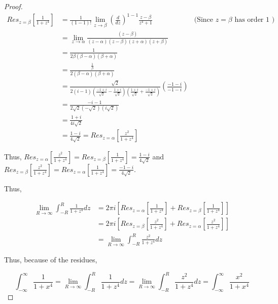 \documentclass{article}
\begin{document}
\begin{proof}
    \begin{align*}
        Res_{z = \beta}\left[\frac{1}{1 + z^4}\right] &= \frac{1}{(1 - 1)!} \lim_{z \to \beta} \left(\frac{d}{dz}\right)^{1 - 1}  \frac{z - \beta}{z^4 + 1} & \text{(Since $z = \beta$ has order 1 )} \\
        &= \lim_{z \to \alpha} \frac{(z - \beta)}{(z - \alpha)(z - \beta)(z + \alpha)(z + \beta)} \\
        &= \frac{1}{2 \beta (\beta - \alpha)(\beta + \alpha)} \\
        &= \frac{\frac{1}{\beta}}{2(\beta - \alpha)(\beta + \alpha)} \\
        &= \frac{\sqrt{2}}{2(i - 1)\left(\frac{-1 + i}{\sqrt{2}} - \frac{1 + i}{\sqrt{2}}\right)\left(\frac{1 + i}{\sqrt{2}} + \frac{-1 + i}{\sqrt{2}}\right)} \left(\frac{-1 - i}{-1 - i}\right) \\
        &= \frac{-i - 1}{2\sqrt{2}\left(-\sqrt{2}\right)\left(i\sqrt{2}\right)} \\
        &= \frac{1 + i}{4i\sqrt{2}} \\
        &= \frac{1 - i}{4\sqrt{2}} = Res_{z = \alpha}\left[\frac{z^2}{1 + z^4}\right]
    \end{align*}

    Thus, $Res_{z = \alpha}\left[\frac{z^2}{1 + z^4}\right] = Res_{z = \beta}\left[\frac{1}{1 + z^4}\right] = \frac{1 - i}{4\sqrt{2}}$ and $Res_{z = \beta}\left[\frac{z^2}{1 + z^4}\right] = Res_{z = \alpha}\left[\frac{1}{1 + z^4}\right] = \frac{-1 - i}{4 \sqrt{2}}$. 
    
    Thus, 

    \begin{align*}
        \lim_{R \to \infty} \int_{-R}^{R}  \frac{1}{1 + z^4} dz &= 2 \pi i \left[Res_{z = \alpha}\left[\frac{1}{1 + z^4}\right] + Res_{z = \beta}\left[\frac{1}{1 + z^4}\right]\right]\\
        &= 2 \pi i \left[Res_{z = \beta}\left[\frac{z^2}{1 + z^4}\right] + Res_{z = \alpha}\left[\frac{z^2}{1 + z^4}\right]\right] \\
        &= \lim_{R \to \infty} \int_{-R}^{R}  \frac{z^2}{1 + z^4} dz
    \end{align*}

    Thus, because of the residues,  

    \begin{equation*}
        \int_{-\infty}^{\infty} \frac{1}{1 + x^4} = \lim_{R \to \infty} \int_{-R}^{R}  \frac{1}{1 + z^4} dz = \lim_{R \to \infty} \int_{-R}^{R}  \frac{z^2}{1 + z^4} dz = \int_{-\infty}^{\infty} \frac{x^2}{1 + x^4}
    \end{equation*}


\end{proof}
\end{document}
